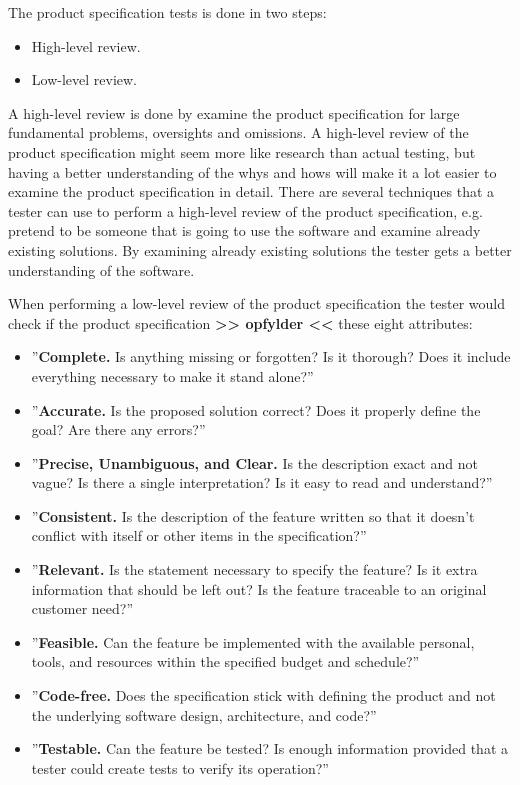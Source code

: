 The product specification tests is done in two steps:

\begin{itemize}
	\item High-level review.
	\item Low-level review.
\end{itemize}

A high-level review is done by examine the product specification for large fundamental problems, oversights and omissions.
A high-level review of the product specification might seem more like research than actual testing, but having a better understanding of the whys and hows will make it a lot easier to examine the product specification in detail.
There are several techniques that a tester can use to perform a high-level review of the product specification, e.g. pretend to be someone that is going to use the software and examine already existing solutions.
By examining already existing solutions the tester gets a better understanding of the software. \cite{SoftwareTesting}

When performing a low-level review of the product specification the tester would check if the product specification \textbf{>> opfylder <<} these eight attributes: \cite{SoftwareTesting}

\begin{itemize}
	\item ''\textbf{Complete.} Is anything missing or forgotten? Is it thorough? Does it include everything necessary to make it stand alone?''
	\item ''\textbf{Accurate.} Is the proposed solution correct? Does it properly define the goal? Are there any errors?''
	\item ''\textbf{Precise, Unambiguous, and Clear.} Is the description exact and not vague? Is there a single interpretation? Is it easy to read and understand?''
	\item ''\textbf{Consistent.} Is the description of the feature written so that it doesn't conflict with itself or other items in the specification?''
	\item ''\textbf{Relevant.} Is the statement necessary to specify the feature? Is it extra information that should be left out? Is the feature traceable to an original customer need?''
	\item ''\textbf{Feasible.} Can the feature be implemented with the available personal, tools, and resources within the specified budget and schedule?''
	\item ''\textbf{Code-free.} Does the specification stick with defining the product and not the underlying software design, architecture, and code?''
	\item ''\textbf{Testable.} Can the feature be tested? Is enough information provided that a tester could create tests to verify its operation?''
\end{itemize}


